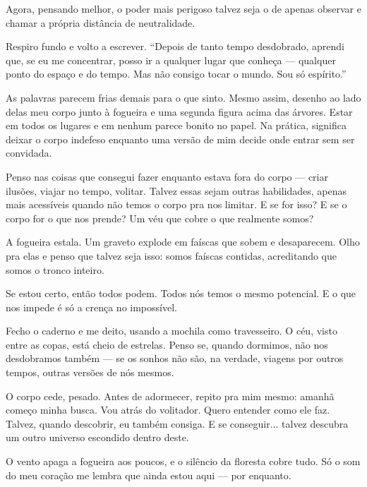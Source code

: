 Agora, pensando melhor, o poder mais perigoso talvez seja o de apenas observar e chamar a própria distância de neutralidade.

Respiro fundo e volto a escrever.  
“Depois de tanto tempo desdobrado, aprendi que, se eu me concentrar, posso ir a qualquer lugar que conheça — qualquer ponto do espaço e do tempo. Mas não consigo tocar o mundo. Sou só espírito.”  

As palavras parecem frias demais para o que sinto. Mesmo assim, desenho ao lado delas meu corpo junto à fogueira e uma segunda figura acima das árvores. Estar em todos os lugares e em nenhum parece bonito no papel. Na prática, significa deixar o corpo indefeso enquanto uma versão de mim decide onde entrar sem ser convidada.

Penso nas coisas que consegui fazer enquanto estava fora do corpo — criar ilusões, viajar no tempo, volitar.  
Talvez essas sejam outras habilidades, apenas mais acessíveis quando não temos o corpo pra nos limitar.  
E se for isso?  
E se o corpo for o que nos prende?  
Um véu que cobre o que realmente somos?

A fogueira estala. Um graveto explode em faíscas que sobem e desaparecem.  
Olho pra elas e penso que talvez seja isso: somos faíscas contidas, acreditando que somos o tronco inteiro.

Se estou certo, então todos podem.  
Todos nós temos o mesmo potencial.  
E o que nos impede é só a crença no impossível.

Fecho o caderno e me deito, usando a mochila como travesseiro.  
O céu, visto entre as copas, está cheio de estrelas.  
Penso se, quando dormimos, não nos desdobramos também — se os sonhos não são, na verdade, viagens por outros tempos, outras versões de nós mesmos.  

O corpo cede, pesado.  
Antes de adormecer, repito pra mim mesmo: amanhã começo minha busca.  
Vou atrás do volitador.  
Quero entender como ele faz.  
Talvez, quando descobrir, eu também consiga.  
E se conseguir...  
talvez descubra um outro universo escondido dentro deste.

O vento apaga a fogueira aos poucos, e o silêncio da floresta cobre tudo.  
Só o som do meu coração me lembra que ainda estou aqui — por enquanto.
